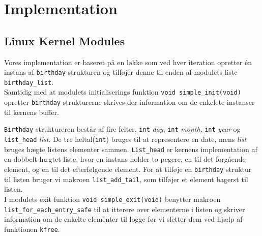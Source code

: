 \documentclass[main.tex]{subfile}
\begin{document}
\section{Implementation}
\subsection{Linux Kernel Modules}
Vores implementation er baseret på en løkke som ved hver iteration opretter én instans af \texttt{birthday} strukturen og tilføjer denne til enden af modulets liste \texttt{birthday\_list}.\\

Samtidig med at modulets initialiserings funktion \texttt{void simple\_init(void)} opretter \texttt{birthday} strukturerne skrives der information om de enkelete instanser til kernens buffer. 

\texttt{Birthday} struktureren består af fire felter, \texttt{int} \emph{day}, \texttt{int} \emph{month}, \texttt{int} \emph{year} og \texttt{list\_head} \emph{list}. De tre heltal(\texttt{int}) bruges til at representere en date, mens \emph{list} bruges hægte listens elementer sammen. \texttt{List\_head} er kernens implementation af en dobbelt hægtet liste, hvor en instans holder to pegere, en til det forgående element, og en til det efterfølgende element. For at tilføje en \texttt{birthday} struktur til listen bruger vi makroen \texttt{list\_add\_tail}, som tilføjer et element bagerst til listen.\\

I modulets exit funktion \texttt{void simple\_exit(void)} benytter makroen \texttt{list\_for\_each\_entry\_safe} til at itterere over elementerne i listen og skriver information om de enkelte elementer til logge før vi sletter dem ved hjælp af funktionen \texttt{kfree}. 
\end{document}
